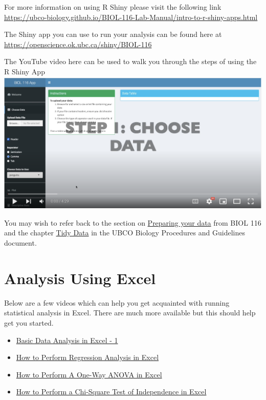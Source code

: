 \documentclass[
]{book}
\providecommand{\tightlist}{%
  \setlength{\itemsep}{0pt}\setlength{\parskip}{0pt}}
\begin{document}
For more information on using R Shiny please visit the following link \url{https://ubco-biology.github.io/BIOL-116-Lab-Manual/intro-to-r-shiny-apps.html}

The Shiny app you can use to run your analysis can be found here at \url{https://openscience.ok.ubc.ca/shiny/BIOL-116}

The YouTube video here can be used to walk you through the steps of using the R Shiny App \includegraphics{images/shiny-app.png}

You may wish to refer back to the section on \href{https://ubco-biology.github.io/BIOL-116-Lab-Manual/preparing-your-data.html}{Preparing your data} from BIOL 116 and the chapter \href{https://ubco-biology.github.io/Procedures-and-Guidelines/tidy-data.html}{Tidy Data} in the UBCO Biology Procedures and Guidelines document.

\hypertarget{analysis-using-excel}{%
\chapter*{Analysis Using Excel}\label{analysis-using-excel}}

Below are a few videos which can help you get acquainted with running statistical analysis in Excel. There are much more available but this should help get you started.

\begin{itemize}
\tightlist
\item
  \href{https://www.youtube.com/watch?v=2xxMJEj4Oyg}{Basic Data Analysis in Excel - 1}
\item
  \href{https://www.youtube.com/watch?v=0wr9ojMxkuQ}{How to Perform Regression Analysis in Excel}
\item
  \href{https://www.youtube.com/watch?v=ZvfO7-J5u34}{How to Perform A One-Way ANOVA in Excel}
\item
  \href{https://www.youtube.com/watch?v=NDhmMH25AC4}{How to Perform a Chi-Square Test of Independence in Excel}
\end{itemize}
\end{document}
